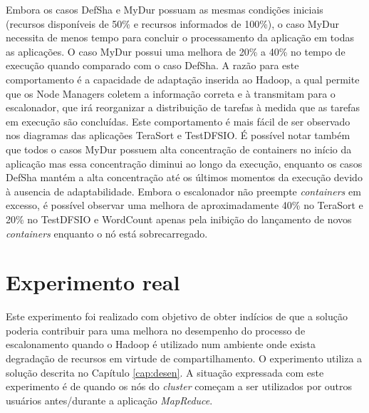 Embora os casos DefSha e MyDur possuam as mesmas condições iniciais (recursos disponíveis de 50\% e recursos informados de 100\%), o caso MyDur necessita de menos tempo para concluir o processamento da aplicação em todas as aplicações. O caso MyDur possui uma melhora de 20\% a 40\% no tempo de execução quando comparado com o caso DefSha. A razão para este comportamento é a capacidade de adaptação inserida ao Hadoop, a qual permite que os Node Managers coletem a informação correta e à transmitam para o escalonador, que irá reorganizar a distribuição de tarefas à medida que as tarefas em execução são concluídas. Este comportamento é mais fácil de ser observado nos diagramas das aplicações TeraSort e TestDFSIO. É possível notar também que todos o casos MyDur possuem alta concentração de containers no início da aplicação mas essa concentração diminui ao longo da execução, enquanto os casos DefSha mantém a alta concentração até os últimos momentos da execução devido à ausencia de adaptabilidade. Embora o escalonador não preempte \textit{containers} em excesso, é possível observar uma melhora de aproximadamente 40\% no TeraSort e 20\% no TestDFSIO e WordCount apenas pela inibição do lançamento de novos \textit{containers} enquanto o nó está sobrecarregado.



\section{Experimento real}
\label{sec:expReal}
Este experimento foi realizado com objetivo de obter indícios de que a solução poderia contribuir para uma melhora no desempenho do processo de escalonamento quando o Hadoop é utilizado num ambiente onde exista degradação de recursos em virtude de compartilhamento. O experimento utiliza a solução descrita no Capítulo \ref{cap:desen}. A situação expressada com este experimento é de quando os nós do \textit{cluster} começam a ser utilizados por outros usuários antes/durante a aplicação \textit{MapReduce}.

